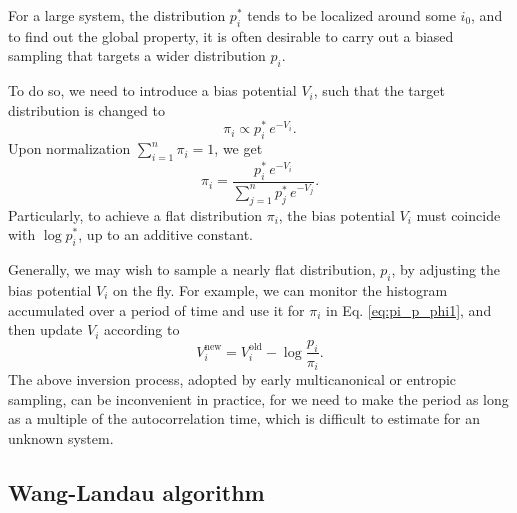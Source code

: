 \documentclass[reprint]{revtex4-1}
\begin{document}
For a large system,
the distribution $p^*_i$ tends to
be localized around some $i_0$,
%
and to find out the global property,
it is often desirable to carry out
a biased sampling that targets
a wider distribution $p_i$.
%



To do so, we need to introduce a bias potential $V_i$,
such that the target distribution is changed to
%
\begin{equation}
  \pi_i \propto p^*_i \, e^{-V_i}.
  \label{eq:pi_p_phi1}
\end{equation}
%
Upon normalization $\sum_{i = 1}^n \pi_i = 1$,
we get
%
\begin{equation}
  \pi_i =
  \frac{ p^*_i \, e^{-V_i} }
  { \sum_{j = 1}^n p^*_j \, e^{-V_j} }.
  \label{eq:pi_p_phi}
\end{equation}
%
Particularly,
to achieve a flat distribution $\pi_i$,
the bias potential $V_i$
must coincide with $\log p^*_i$,
up to an additive constant.



Generally, we may wish to sample
a nearly flat distribution, $p_i$,
by adjusting the bias potential $V_i$
on the fly.
%
For example,
we can monitor the histogram accumulated over
a period of time and use it for $\pi_i$ in
Eq. \eqref{eq:pi_p_phi1},
and then update
$V_i$ according to
$$
V_i^{\mathrm{new}}
=
V_i^{\mathrm{old}}
-
\log \frac{ p_i } { \pi_i }.
$$
%
%
The above inversion process,
adopted by early multicanonical or entropic sampling,
can be inconvenient in practice,
for we need to make the period
as long as a multiple of
the autocorrelation time,
which is difficult to estimate for an unknown system.



\subsection{Wang-Landau algorithm}
\end{document}
